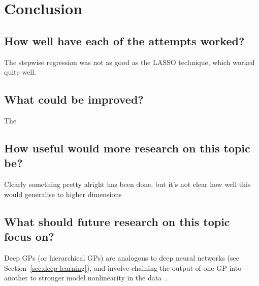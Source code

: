 
\chapter{Conclusion}

\section{How well have each of the attempts worked?}

\begin{todo}
    The stepwise regression was not as good as the LASSO technique, which worked quite well.
\end{todo}

\section{What could be improved?}

\begin{todo}
    The 
\end{todo}

\section{How useful would more research on this topic be?}

\begin{todo}
    Clearly something pretty alright has been done, but it's not clear how well this would generalise to higher dimensions
\end{todo}

\section{What should future research on this topic focus on?}

Deep \acp{GP} (or hierarchical \acp{GP}) are analogous to deep neural networks (see Section~\ref{sec:deep-learning}), and involve chaining the output of one \ac{GP} into another to stronger model nonlinearity in the data~\autocite{damianou2013}.
